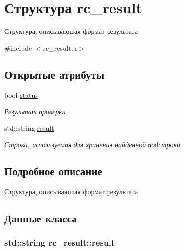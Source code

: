 \hypertarget{structrc__result}{}\section{Структура rc\+\_\+result}
\label{structrc__result}


Структура, описывающая формат результата  




{\ttfamily \#include $<$rc\+\_\+result.\+h$>$}

\subsection*{Открытые атрибуты}
\begin{DoxyCompactItemize}
\item 
bool \hyperlink{structrc__result_ab0d0340122026893c6b5fb577e71b015}{status}
\begin{DoxyCompactList}\small\item\em Результат проверки \end{DoxyCompactList}\item 
std\+::string \hyperlink{structrc__result_aa2797793b3623a02a09c29a60e9094ac}{result}
\begin{DoxyCompactList}\small\item\em Строка, используемая для хранения найденной подстроки \end{DoxyCompactList}\end{DoxyCompactItemize}


\subsection{Подробное описание}
Структура, описывающая формат результата 

\subsection{Данные класса}
\subsubsection[{\texorpdfstring{result}{result}}]{\setlength{\rightskip}{0pt plus 5cm}std\+::string rc\+\_\+result\+::result}\hypertarget{structrc__result_aa2797793b3623a02a09c29a60e9094ac}{}\label{structrc__result_aa2797793b3623a02a09c29a60e9094ac}


